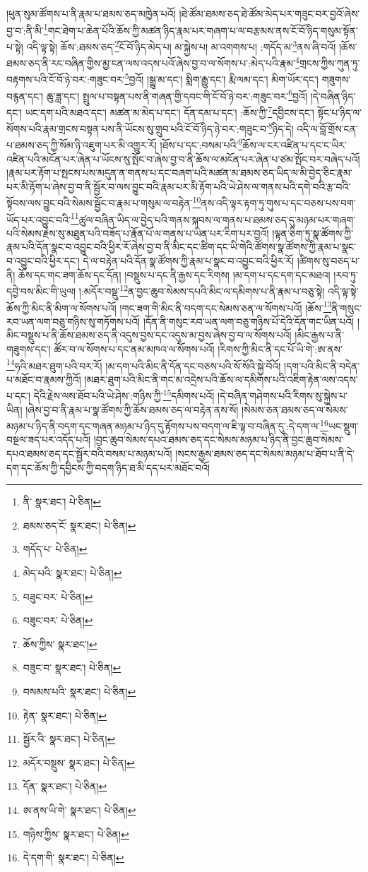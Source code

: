 །ཕུན་སུམ་ཚོགས་པ་ནི་རྣམ་པ་ཐམས་ཅད་མཁྱེན་པའོ། །ཐེ་ཚོམ་ཐམས་ཅད་ཐེ་ཚོམ་མེད་པར་གཟུང་བར་བྱའོ་ཞེས་བྱ་བ་:ནི་མི་\footnote{ནི་  སྣར་ཐང་།  པེ་ཅིན། }གང་ཐེག་པ་ཆེན་པོའི་ཆོས་ཀྱི་མཚན་ཉིད་རྣམ་པར་གཞག་པ་ལ་བརྩམས་ནས་ངོ་བོ་ཉིད་གསུམ་སྟོན་པ་སྟེ། འདི་ལྟ་སྟེ། ཆོས་:ཐམས་ཅད་\footnote{ཐམས་ཅད་ངོ་  སྣར་ཐང་།  པེ་ཅིན། }ངོ་བོ་ཉིད་མེད་པ། མ་སྐྱེས་པ། མ་འགགས་པ། :གདོད་མ་\footnote{གདོད་པ་  པེ་ཅིན། }ནས་ཞི་བའོ། །ཆོས་ཐམས་ཅད་ནི་རང་བཞིན་གྱིས་མྱ་ངན་ལས་འདས་པའོ་ཞེས་བྱ་བ་ལ་སོགས་པ་:མེད་པའི་རྣམ་\footnote{མེད་པའི་  སྣར་ཐང་།  པེ་ཅིན། }གྲངས་ཀྱིས་ཀུན་ཏུ་བརྟགས་པའི་ངོ་བོ་ཉེ་བར་:གཟུང་བར་\footnote{བཟུང་བར་  པེ་ཅིན། }བྱའོ། །སྒྱུ་མ་དང་། སྨིག་རྒྱུ་དང་། རྨི་ལམ་དང་། མིག་ཡོར་དང་། གཟུགས་བརྙན་དང་། ཆུ་ཟླ་དང་། སྤྲུལ་པ་བསྟན་པས་ནི་གཞན་གྱི་དབང་གི་ངོ་བོ་ཉེ་བར་:གཟུང་བར་\footnote{བཟུང་བར་  པེ་ཅིན། }བྱའོ། །དེ་བཞིན་ཉིད་དང་། ཡང་དག་པའི་མཐའ་དང་། མཚན་མ་མེད་པ་དང་། དོན་དམ་པ་དང་། :ཆོས་ཀྱི་\footnote{ཆོས་ཀྱིས་  སྣར་ཐང་། }དབྱིངས་དང་། སྟོང་པ་ཉིད་ལ་སོགས་པའི་རྣམ་གྲངས་བསྟན་པས་ནི་ཡོངས་སུ་གྲུབ་པའི་ངོ་བོ་ཉིད་ཉེ་བར་:གཟུང་བ་\footnote{བཟུང་བ་  སྣར་ཐང་།  པེ་ཅིན། }ཉིད་དེ། འདི་ལ་བློ་གྲོས་ངན་པ་ཐམས་ཅད་ཀྱི་སོམ་ཉི་འཇུག་པར་མི་འགྱུར་རོ། །ཐོས་པ་དང་:བསམ་པའི་\footnote{བསམས་པའི་  སྣར་ཐང་།  པེ་ཅིན། }ཆོས་ལ་ངར་འཛིན་པ་དང་ང་ཡིར་འཛིན་པའི་མངོན་པར་ཞེན་པ་ཡོངས་སུ་སྤོང་བ་ཞེས་བྱ་བ་ནི་ཆོས་ལ་མངོན་པར་ཞེན་པ་ཙམ་སྤོང་བར་བཞེད་པའོ། །རྣམ་པར་རྟོག་པ་སྤངས་པས་མདུན་ན་གནས་པ་དང་བཞག་པའི་མཚན་མ་ཐམས་ཅད་ཡིད་ལ་མི་བྱེད་ཅིང་རྣམ་པར་མི་རྟོག་པ་ཞེས་བྱ་བ་ནི་སྦྱོར་བ་ལས་བྱུང་བའི་རྣམ་པར་མི་རྟོག་པའི་ཡེ་ཤེས་ལ་གནས་པའི་དགེ་བའི་རྩ་བའི་སྟོབས་ལས་བྱུང་བའི་སེམས་སྦྱོང་བ་རྣམ་པ་གསུམ་ལ་བརྟེན་\footnote{རྟེན་  སྣར་ཐང་།  པེ་ཅིན། }ནས་འདི་ལྟར་རྟག་ཏུ་གུས་པ་དང་བཅས་པས་བག་ཡོད་པར་འབྱུང་བའི་\footnote{སྦྱོར་འི་  སྣར་ཐང་།  པེ་ཅིན། }ཚུལ་བཞིན་ཡིད་ལ་བྱེད་པའི་གནས་སྐབས་ལ་གནས་པ་ཐམས་ཅད་དུ་མཉམ་པར་གཞག་པའི་སེམས་རྗེས་སུ་མཐུན་པའི་བཟོད་པ་རྣོན་པོ་ལ་གནས་པ་ཡིན་པར་རིག་པར་བྱའོ། །ལྟན་ཅིག་ཏུ་སྣ་ཚོགས་ཀྱི་རྣམ་པའི་དོན་སྣང་བ་འབྱུང་བའི་ཕྱིར་རོ་ཞེས་བྱ་བ་ནི་མིང་དང་ཚིག་དང་ཡི་གེའི་ཚོགས་སྣ་ཚོགས་ཀྱི་རྣམ་པ་སྣང་བ་འབྱུང་བའི་ཕྱིར་དང་། དེ་ལ་བརྟེན་པའི་དོན་སྣ་ཚོགས་ཀྱི་རྣམ་པ་སྣང་བ་འབྱུང་བའི་ཕྱིར་རོ། །ཚིགས་སུ་བཅད་པ་ནི། ཆོས་དང་གང་ཟག་ཆོས་དང་དོན། །བསྡུས་པ་དང་ནི་རྒྱས་དང་རིགས། །མ་དག་པ་དང་དག་དང་མཐའ། །རབ་ཏུ་དབྱེ་བས་མིང་གི་ཡུལ། །:མདོར་བསྡུ་\footnote{མདོར་བསྡུས་  སྣར་ཐང་།  པེ་ཅིན། }ན་བྱང་ཆུབ་སེམས་དཔའི་མིང་ལ་དམིགས་པ་ནི་རྣམ་པ་བཅུ་སྟེ། འདི་ལྟ་སྟེ་ཆོས་ཀྱི་མིང་ནི་མིག་ལ་སོགས་པའོ། །གང་ཟག་གི་མིང་ནི་བདག་དང་སེམས་ཅན་ལ་སོགས་པའོ། །ཆོས་\footnote{དོན་  སྣར་ཐང་།  པེ་ཅིན། }ནི་གསུང་རབ་ཡན་ལག་བཅུ་གཉིས་སུ་གཏོགས་པའོ། །དོན་ནི་གསུང་རབ་ཡན་ལག་བཅུ་གཉིས་པོ་དེའི་དོན་གང་ཡིན་པའོ། །མིང་བསྡུས་པ་ནི་ཆོས་ཐམས་ཅད་ནི་འདུས་བྱས་དང་འདུས་མ་བྱས་ཞེས་བྱ་བ་ལ་སོགས་པའོ། །མིང་རྒྱས་པ་ནི་གཟུགས་དང་། ཚོར་བ་ལ་སོགས་པ་དང་ནམ་མཁའ་ལ་སོགས་པའོ། །རིགས་ཀྱི་མིང་ནི་དང་པོ་ཡི་གེ་:ཨ་ནས་\footnote{ཨ་ནས་ཡི་གེ་  སྣར་ཐང་།  པེ་ཅིན། }ཧའི་མཐར་ཐུག་པའི་བར་རོ། །མ་དག་པའི་མིང་ནི་དོན་དང་བཅས་པའི་སོ་སོའི་སྐྱེ་བོའོ། །དག་པའི་མིང་ནི་བདེན་པ་མཐོང་བ་རྣམས་ཀྱིའོ། །མཐར་ཐུག་པའི་མིང་ནི་གང་མ་འདྲེས་པའི་ཆོས་ལ་དམིགས་པའི་འཇིག་རྟེན་ལས་འདས་པ་དང་། དེའི་རྗེས་ལས་ཐོབ་པའི་ཡེ་ཤེས་:གཉིས་ཀྱི་\footnote{གཉིས་ཀྱིས་  སྣར་ཐང་།  པེ་ཅིན། }དམིགས་པའོ། །དེ་བཞིན་གཤེགས་པའི་རིགས་སུ་སྐྱེས་པ་ཡིན། །ཞེས་བྱ་བ་ནི་རྣམ་པ་སྣ་ཚོགས་ཀྱི་ཆོས་ཐམས་ཅད་ལ་བརྟེན་ནས་སོ། །སེམས་ཅན་ཐམས་ཅད་ལ་སེམས་མཉམ་པ་ཉིད་ནི་བདག་དང་གཞན་མཉམ་པ་ཉིད་དུ་རྟོགས་པས་བདག་ལ་ཇི་ལྟ་བ་བཞིན་དུ་:དེ་དག་ལ་\footnote{དེ་དག་གི་  སྣར་ཐང་།  པེ་ཅིན། }ཡང་སྡུག་བསྔལ་ཟད་པར་འདོད་པའོ། །བྱང་ཆུབ་སེམས་དཔའ་ཐམས་ཅད་དང་སེམས་མཉམ་པ་ཉིད་ནི་བྱང་ཆུབ་སེམས་དཔའ་ཐམས་ཅད་དང་སྦྱོར་བའི་བསམ་པ་མཉམ་པའོ། །སངས་རྒྱས་ཐམས་ཅད་དང་སེམས་མཉམ་པ་ཐོབ་པ་ནི་དེ་དག་དང་ཆོས་ཀྱི་དབྱིངས་ཀྱི་བདག་ཉིད་ཐ་མི་དད་པར་མཐོང་བའོ། 